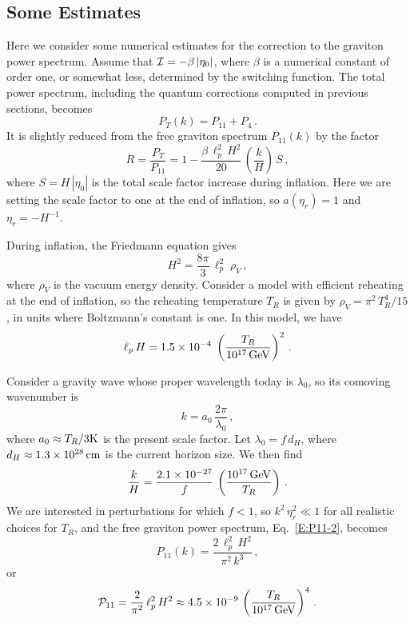 \documentclass[preprint,prd,showpacs,superscriptaddress]{revtex4}
\begin{document}
 \subsection{ Some Estimates}
 \label{S:estimates}
 
 Here we consider some numerical estimates for the correction to the graviton power spectrum. Assume that 
 ${\cal I} = -\beta\, |\eta_0|$, where $\beta$ is a numerical constant of order one, or somewhat less, determined by the switching
 function. The total power spectrum, including the quantum corrections computed in previous sections, becomes
 \begin{equation}
P_T(k) = P_{11} + P_4\,.
\end{equation}
It is slightly reduced from the free graviton spectrum $P_{11}(k)$ by the factor
\begin{equation}
R = \frac{P_T}{P_{11}} = 1 - \frac{\beta \, \ell_p^2\, H^2}{20} \, \left(\frac{k}{H} \right)\, S\,,
\label{E:R}
\end{equation}
where $S = H\, |\eta_0|$ is the total scale factor increase during inflation. Here we are setting the scale factor to
one at the end of inflation, so $a(\eta_r)=1$ and $\eta_r =- H^{-1}$.

During inflation, the Friedmann equation gives
 \begin{equation}
H^2 = \frac{8 \pi}{3}\, \ell_p^2\;  \rho_V\,,
\end{equation}
where $\rho_V$ is the vacuum energy density. Consider a model with efficient reheating at the end of inflation, so
the reheating temperature $T_R$ is given by $\rho_V = \pi^2\, T_R^4/15$, in units where Boltzmann's constant is one.
In this model, we have
 \begin{equation}
\ell_p\, H = 1.5 \times 10^{-4} \; \left( \frac{T_R}{10^{17}\, {\rm GeV}} \right)^2   \,.
\end{equation}

Consider a gravity wave whose proper wavelength today is $\lambda_0$, so its comoving wavenumber is
\begin{equation}
k = a_0 \, \frac{2 \pi}{\lambda_0}\,,
\end{equation}
where $a_0 \approx T_R/ 3{\rm K}$ is the present scale factor. Let $\lambda_0 = f\, d_H$, where $d_H \approx 
1.3 \times 10^{28} \,{\rm cm}$ is the current horizon size. We then find
\begin{equation}
\frac{k}{H} = \frac{2.1 \times 10^{-27}}{f} \, \left( \frac{10^{17}\, {\rm GeV}}{T_R} \right)\,.
\end{equation}
We are interested in perturbations for which $f < 1$, so $k^2 \, \eta_r^2 \ll 1$ for all realistic choices for $T_R$,
and the free graviton power spectrum, Eq.~\eqref{E:P11-2}, becomes
\begin{equation}
P_{11}(k) = \frac{2\, \ell_p^2\, H^2}{\pi^2 \, k^3}\,,
\end{equation}
or
\begin{equation}
{\cal P}_{11} = \frac{2}{\pi^2} \, \ell_p^2\, H^2 \approx 4.5 \times 10^{-9}\, \left(\frac{T_R}{10^{17}\, {\rm GeV}} \right)^4\,.
\end{equation}
\end{document}
